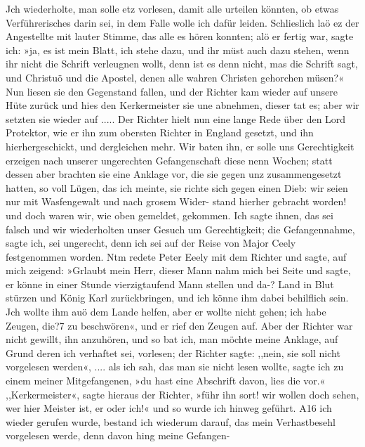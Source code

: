 Jch wiederholte, man solle etz vorlesen, damit alle urteilen könnten,
ob etwas Verführerisches darin sei, in dem Falle wolle ich dafür
leiden. Schlieslich laö ez der Angestellte mit lauter Stimme, das
alle es hören konnten; alö er fertig war, sagte ich: »ja, es ist
mein Blatt, ich stehe dazu, und ihr müst auch dazu stehen, wenn
ihr nicht die Schrift verleugnen wollt, denn ist es denn nicht, mas
die Schrift sagt, und Christuö und die Apostel, denen alle wahren
Christen gehorchen müsen?« Nun liesen sie den Gegenstand
fallen, und der Richter kam wieder auf unsere Hüte zurück und
hies den Kerkermeister sie une abnehmen, dieser tat es; aber wir
setzten sie wieder auf ..... Der Richter hielt nun eine lange
Rede über den Lord Protektor, wie er ihn zum obersten Richter
in England gesetzt, und ihn hierhergeschickt, und dergleichen mehr.
Wir baten ihn, er solle uns Gerechtigkeit erzeigen nach unserer
ungerechten Gefangenschaft diese nenn Wochen; statt dessen aber
brachten sie eine Anklage vor, die sie gegen unz zusammengesetzt
hatten, so voll Lügen, das ich meinte, sie richte sich gegen einen
Dieb: wir seien nur mit Wasfengewalt und nach grosem Wider-
stand hierher gebracht worden! und doch waren wir, wie oben
gemeldet, gekommen. Ich sagte ihnen, das sei falsch und wir
wiederholten unser Gesuch um Gerechtigkeit; die Gefangennahme,
sagte ich, sei ungerecht, denn ich sei auf der Reise von Major
Ceely festgenommen worden. Ntm redete Peter Eeely mit dem
Richter und sagte, auf mich zeigend: »Grlaubt mein Herr, dieser
Mann nahm mich bei Seite und sagte, er könne in einer Stunde
vierzigtaufend Mann stellen und da-? Land in Blut stürzen und
König Karl zurückbringen, und ich könne ihm dabei behilflich sein.
Jch wollte ihm auö dem Lande helfen, aber er wollte nicht
gehen; ich habe Zeugen, die?7 zu beschwören«, und er rief den
Zeugen auf. Aber der Richter war nicht gewillt, ihn anzuhören,
und so bat ich, man möchte meine Anklage, auf Grund deren
ich verhaftet sei, vorlesen; der Richter sagte: ,,nein, sie soll nicht
vorgelesen werden«, .... als ich sah, das man sie nicht lesen
wollte, sagte ich zu einem meiner Mitgefangenen, »du hast eine
Abschrift davon, lies die vor.« ,,Kerkermeister«, sagte hieraus der
Richter, »führ ihn sort! wir wollen doch sehen, wer hier Meister
ist, er oder ich!« und so wurde ich hinweg geführt. A16 ich
wieder gerufen wurde, bestand ich wiederum darauf, das mein
Verhastbesehl vorgelesen werde, denn davon hing meine Gefangen-


